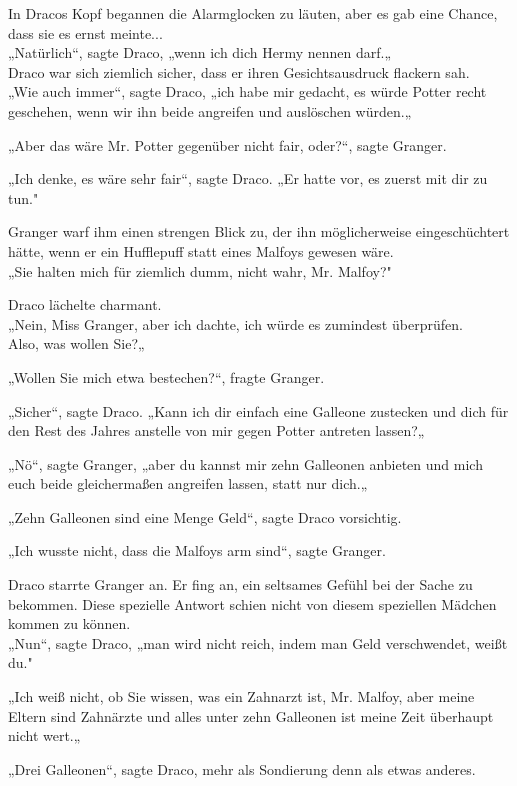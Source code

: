 {In Dracos Kopf begannen die Alarmglocken zu läuten, aber es gab eine Chance, dass sie es ernst meinte...\\ „Natürlich“, sagte Draco, „wenn ich dich Hermy nennen darf.„\\ Draco war sich ziemlich sicher, dass er ihren Gesichtsausdruck flackern sah.\\ „Wie auch immer“, sagte Draco, „ich habe mir gedacht, es würde Potter recht geschehen, wenn wir ihn beide angreifen und auslöschen würden.„

„Aber das wäre Mr. Potter gegenüber nicht fair, oder?“, sagte Granger.

„Ich denke, es wäre sehr fair“, sagte Draco. „Er hatte vor, es zuerst mit dir zu tun."

Granger warf ihm einen strengen Blick zu, der ihn möglicherweise eingeschüchtert hätte, wenn er ein Hufflepuff statt eines Malfoys gewesen wäre.\\ „Sie halten mich für ziemlich dumm, nicht wahr, Mr. Malfoy?"

Draco lächelte charmant.\\ „Nein, Miss Granger, aber ich dachte, ich würde es zumindest überprüfen.\\ Also, was wollen Sie?„

„Wollen Sie mich etwa bestechen?“, fragte Granger.

„Sicher“, sagte Draco. „Kann ich dir einfach eine Galleone zustecken und dich für den Rest des Jahres anstelle von mir gegen Potter antreten lassen?„

„Nö“, sagte Granger, „aber du kannst mir zehn Galleonen anbieten und mich euch beide gleichermaßen angreifen lassen, statt nur dich.„

„Zehn Galleonen sind eine Menge Geld“, sagte Draco vorsichtig.

„Ich wusste nicht, dass die Malfoys arm sind“, sagte Granger.

Draco starrte Granger an. Er fing an, ein seltsames Gefühl bei der Sache zu bekommen. Diese spezielle Antwort schien nicht von diesem speziellen Mädchen kommen zu können.\\ „Nun“, sagte Draco, „man wird nicht reich, indem man Geld verschwendet, weißt du."

„Ich weiß nicht, ob Sie wissen, was ein Zahnarzt ist, Mr. Malfoy, aber meine Eltern sind Zahnärzte und alles unter zehn Galleonen ist meine Zeit überhaupt nicht wert.„

„Drei Galleonen“, sagte Draco, mehr als Sondierung denn als etwas anderes.

}
